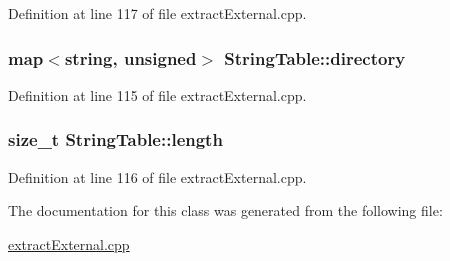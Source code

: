 Definition at line 117 of file extract\-External.\-cpp.

\hypertarget{classStringTable_aae367f0869109a838ade94339db9eb2d}{
\subsubsection[{directory}]{\setlength{\rightskip}{0pt plus 5cm}map$<$string, unsigned$>$ String\-Table\-::directory\hspace{0.3cm}{\ttfamily [private]}}}\label{classStringTable_aae367f0869109a838ade94339db9eb2d}


Definition at line 115 of file extract\-External.\-cpp.

\hypertarget{classStringTable_a0990f0196e8550c5040393f30888eb61}{
\subsubsection[{length}]{\setlength{\rightskip}{0pt plus 5cm}size\-\_\-t String\-Table\-::length\hspace{0.3cm}{\ttfamily [private]}}}\label{classStringTable_a0990f0196e8550c5040393f30888eb61}


Definition at line 116 of file extract\-External.\-cpp.



The documentation for this class was generated from the following file\-:\begin{DoxyCompactItemize}
\item 
\hyperlink{extractExternal_8cpp}{extract\-External.\-cpp}\end{DoxyCompactItemize}
